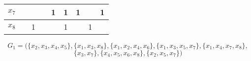 \documentclass[12pt]{article}
\begin{document}
\begin{enumerate}
\begin{tabular}{|l|c|c|c|c|c|c|c|c|}
$x_7$ &                            &                            &                            & 1                          & 1                          & 1                          &                            & 1                          \\ \hline
$x_8$ &                            & 1                          &                            &                            & 1                          &                            & 1                          &                            \\ \hline
\end{tabular}
\begin{equation*}
    G_1 = (\{x_2,x_3,x_4,x_5\},\{x_1,x_3,x_8\},\{x_1,x_2,x_4,x_6\},\{x_1,x_3,x_5,x_7\},\{x_1,x_4,x_7,x_8\},
\end{equation*}
\begin{equation*}
    \{x_3,x_7\},\{x_4,x_5,x_6,x_8\},\{x_2,x_5,x_7\})
\end{equation*}


\end{enumerate}
\end{document}
